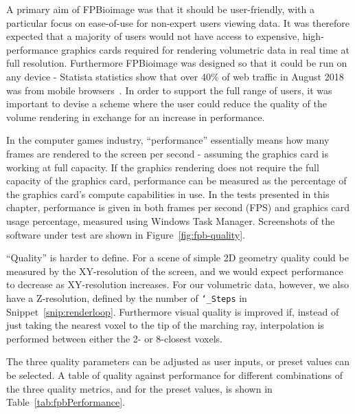 A primary aim of FPBioimage was that it should be user-friendly, with a particular focus on ease-of-use for non-expert users viewing data.
It was therefore expected that a majority of users would not have access to expensive, high-performance graphics cards required for rendering volumetric data in real time at full resolution.
Furthermore FPBioimage was designed so that it could be run on any device - Statista statistics show that over 40\% of web traffic in August 2018 was from mobile browsers~\cite{statistica2018mobile}.
In order to support the full range of users, it was important to devise a scheme where the user could reduce the quality of the volume rendering in exchange for an increase in performance.

In the computer games industry, ``performance'' essentially means how many frames are rendered to the screen per second - assuming the graphics card is working at full capacity.
If the graphics rendering does not require the full capacity of the graphics card, performance can be measured as the percentage of the graphics card's compute capabilities in use.
In the tests presented in this chapter, performance is given in both frames per second (FPS) and graphics card usage percentage, measured using Windows Task Manager.
Screenshots of the software under test are shown in Figure~\ref{fig:fpb-quality}.

``Quality'' is harder to define.
For a scene of simple 2D geometry quality could be measured by the XY-resolution of the screen, and we would expect performance to decrease as XY-resolution increases.
For our volumetric data, however, we also have a Z-resolution, defined by the number of \texttt{\char`_Steps} in Snippet~\ref{snip:renderloop}.
Furthermore visual quality is improved if, instead of just taking the nearest voxel to the tip of the marching ray, interpolation is performed between either the 2- or 8-closest voxels.

The three quality parameters can be adjusted as user inputs, or preset values can be selected.
A table of quality against performance for different combinations of the three quality metrics, and for the preset values, is shown in Table~\ref{tab:fpbPerformance}. 

